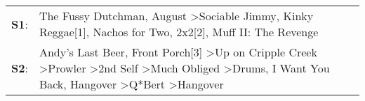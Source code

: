 \begin{supertabular}{p{0.03\textwidth}p{0.92\textwidth}}
 \textbf{S1}:  &                                                                                                                                                                                                                       The Fussy Dutchman\textsuperscript{}, \enspace August\textsuperscript{} \textgreater \enspace Sociable Jimmy\textsuperscript{}, \enspace Kinky Reggae[1]\textsuperscript{}, \enspace Nachos for Two\textsuperscript{}, \enspace 2x2[2]\textsuperscript{}, \enspace Muff II: The Revenge\textsuperscript{}  \enspace  \\
 \textbf{S2}:  &  Andy's Last Beer\textsuperscript{}, \enspace Front Porch[3]\textsuperscript{} \textgreater \enspace Up on Cripple Creek\textsuperscript{} \textgreater \enspace Prowler\textsuperscript{} \textgreater \enspace 2nd Self\textsuperscript{} \textgreater \enspace Much Obliged\textsuperscript{} \textgreater \enspace Drums\textsuperscript{}, \enspace I Want You Back\textsuperscript{}, \enspace Hangover\textsuperscript{} \textgreater \enspace Q*Bert\textsuperscript{} \textgreater \enspace Hangover\textsuperscript{}  \enspace  \\
\end{supertabular}

